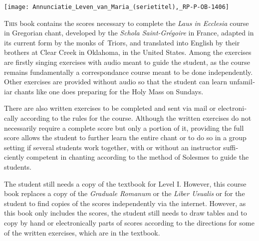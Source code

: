 \begin{titlepage}
 \begin{center}
 \fontsize{40}{50}\selectfont{}
 \end{center}
  \vspace{\baselineskip}
\centering
\texttt{[image: Annunciatie\_Leven\_van\_Maria\_(serietitel),\_RP-P-OB-1406]}
\begin{center}
 \fontsize{32}{40}\selectfont{}
\end{center}

 \vfill
 
{}
 {\centering{\capspace{\YEAR}\par}}
 \clearpage\thispagestyle{empty}
\end{titlepage}

\frontmatter

\begin{otherlanguage}{english}
\lettrine{T}{his} book contains the scores necessary to complete the \textit{Laus in Ecclesia} course in Gregorian chant, developed by the \textit{Schola Saint-Grégoire} in France, adapted in its current form by the monks of\ Triors, and translated into English by their brothers at Clear Creek in Oklahoma, in the United States. Among the exercises are firstly singing exercises with audio meant to guide the student, as the course remains fundamentally a correspondance course meant to be done independently. Other exercises are provided without audio so that the student can learn unfamiliar chants like one does preparing for the Holy Mass on Sundays.

There are also written exercises to be completed and sent via mail or electronically according to the rules for the course. Although the written exercises do not necessarily require a complete score but only a portion of it, providing the full score allows the student to further learn the entire chant or to do so in a group setting if several students work together, with or without an instructor sufficiently competent in chanting according to the method of So\-lesmes to guide the students.

The student still needs a copy of the textbook for Level I. However, this course book replaces a copy of the \textit{Graduale Romanum} or the \textit{Liber Usualis} or for the student to find copies of the scores independently via the internet. However, as this book only includes the scores, the student still needs to draw tables and to copy by hand or electronically parts of scores according to the directions for some of the written exercises, which are in the textbook.\end{otherlanguage}

